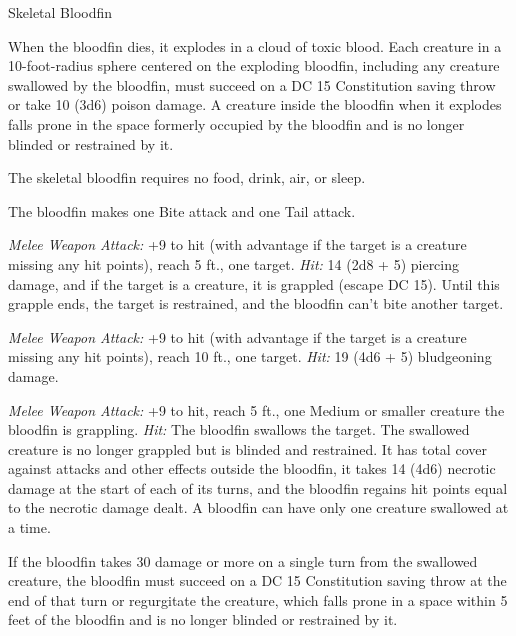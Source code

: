 \documentclass[10pt,a4paper,twoside,fancy,bg=print,twocolumn,openany,nodeprecatedcode]{dndbook}
\begin{document}
\begin{DndMonster}[float=t]{Skeletal Bloodfin}
\DndMonsterBasics[
armor-class = {16 (natural armor)},
hit-points = {\DndDice{11d10 + 33}},
speed = {5 ft., swim 50 ft.}
]
\DndMonsterAbilityScores[
 str = 20,
 dex = 14,
 con = 16,
 int = 2,
 wis = 10,
 cha = 3
]
\DndMonsterDetails[
skills = {Perception +4},
damage-immunities = {poison},
damage-resistances = {piercing, slashing},
condition-immunities = {charmed, deafened, frightened, paralyzed, poisoned},
senses = {blindsight 100 ft. (blind beyond this radius), passive perception 14},
challenge = 9,
]

When the bloodfin dies, it explodes in a cloud of toxic blood. Each creature in a 10-foot-radius sphere centered on the exploding bloodfin, including any creature swallowed by the bloodfin, must succeed on a DC 15 Constitution saving throw or take 10 (3d6) poison damage. A creature inside the bloodfin when it explodes falls prone in the space formerly occupied by the bloodfin and is no longer blinded or restrained by it.

The skeletal bloodfin requires no food, drink, air, or sleep.

The bloodfin makes one Bite attack and one Tail attack.

\textsl{Melee Weapon Attack:} +9 to hit (with advantage if the target is a creature missing any hit points), reach 5 ft., one target. \textsl{Hit:} 14 (2d8 + 5) piercing damage, and if the target is a creature, it is grappled (escape DC 15). Until this grapple ends, the target is restrained, and the bloodfin can't bite another target.

\textsl{Melee Weapon Attack:} +9 to hit (with advantage if the target is a creature missing any hit points), reach 10 ft., one target. \textsl{Hit:} 19 (4d6 + 5) bludgeoning damage.

\textsl{Melee Weapon Attack:} +9 to hit, reach 5 ft., one Medium or smaller creature the bloodfin is grappling. \textsl{Hit:} The bloodfin swallows the target. The swallowed creature is no longer grappled but is blinded and restrained. It has total cover against attacks and other effects outside the bloodfin, it takes 14 (4d6) necrotic damage at the start of each of its turns, and the bloodfin regains hit points equal to the necrotic damage dealt. A bloodfin can have only one creature swallowed at a time.

If the bloodfin takes 30 damage or more on a single turn from the swallowed creature, the bloodfin must succeed on a DC 15 Constitution saving throw at the end of that turn or regurgitate the creature, which falls prone in a space within 5 feet of the bloodfin and is no longer blinded or restrained by it.

\end{DndMonster}
\end{document}
